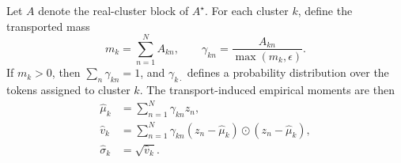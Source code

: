 \documentclass[journal]{IEEEtran}
\begin{document}
Let \(A\) denote the real-cluster block of \(A^\star\). For each cluster \(k\), define the transported mass
\begin{equation}
m_k = \sum_{n=1}^N A_{kn},
\qquad
\gamma_{kn} = \frac{A_{kn}}{\max(m_k,\epsilon)}.
\end{equation}
If \(m_k > 0\), then \(\sum_n \gamma_{kn} = 1\), and \(\gamma_{k\cdot}\) defines a probability distribution over the tokens assigned to cluster \(k\). The transport-induced empirical moments are then
\begin{align}
\hat{\mu}_k &= \sum_{n=1}^N \gamma_{kn} z_n, \label{eq:mu_hat}\\
\hat{v}_k &= \sum_{n=1}^N \gamma_{kn} (z_n - \hat{\mu}_k) \odot (z_n - \hat{\mu}_k), \label{eq:var_hat}\\
\hat{\sigma}_k &= \sqrt{\hat{v}_k}. \label{eq:sigma_hat}
\end{align}
\end{document}
